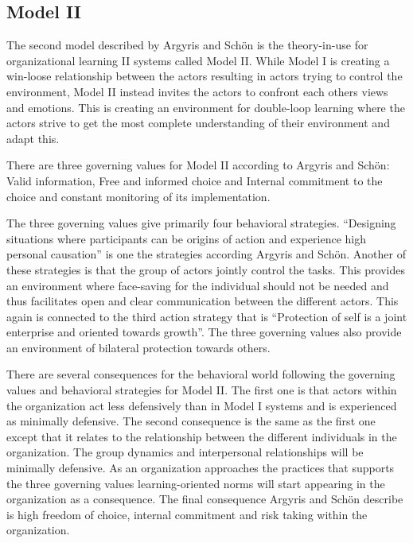 \subsection{Model II} %
\label{sub:organizational_learning_ii}
The second model described by Argyris and Schön is the theory-in-use for organizational learning II systems called Model II. While Model I is creating a win-loose relationship between the actors resulting in actors trying to control the environment, Model II instead invites the actors to confront each others views and emotions. This is creating an environment for double-loop learning where the actors strive to get the most complete understanding of their environment and adapt this. 

There are three governing values for Model II according to Argyris and Schön: Valid information, Free and informed choice and Internal commitment to the choice and constant monitoring of its implementation. 

The three governing values give primarily four behavioral strategies. ``Designing situations where participants can be origins of action and experience high personal causation'' is one the strategies according Argyris and Schön. Another of these strategies is that the group of actors jointly control the tasks. This provides an environment where face-saving for the individual should not be needed and thus facilitates open and clear communication between the different actors. This again is connected to the third action strategy that is ``Protection of self is a joint enterprise and oriented towards growth''. The three governing values also provide an environment of bilateral protection towards others. 

There are several consequences for the behavioral world following the governing values and behavioral strategies for Model II. The first one is that actors within the organization act less defensively than in Model I systems and is experienced as minimally defensive. The second consequence is the same as the first one except that it relates to the relationship between the different individuals in the organization. The group dynamics and interpersonal relationships will be minimally defensive. As an organization approaches the practices that supports the three governing values learning-oriented norms will start appearing in the organization as a consequence. The final consequence Argyris and Schön describe is high freedom of choice, internal commitment and risk taking within the organization. 


